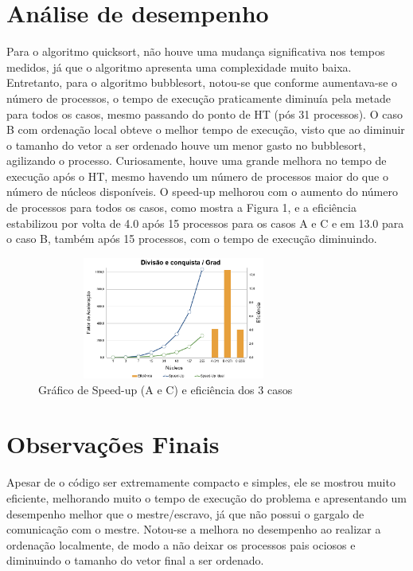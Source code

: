 \documentclass{article}
\begin{document}
\begin{multicols*}{2}
\section{Análise de desempenho}
Para o algoritmo quicksort, não houve uma mudança significativa nos tempos medidos, já que o algoritmo apresenta uma complexidade muito baixa. Entretanto, para o algoritmo bubblesort, notou-se que conforme aumentava-se o número de processos, o tempo de execução praticamente diminuía pela metade para todos os casos, mesmo passando do ponto de HT (pós 31 processos). O caso B com ordenação local obteve o melhor tempo de execução, visto que ao diminuir o tamanho do vetor a ser ordenado houve um menor gasto no bubblesort, agilizando o processo. Curiosamente, houve uma grande melhora no tempo de execução após o HT, mesmo havendo um número de processos maior do que o número de núcleos disponíveis. O speed-up melhorou com o aumento do número de processos para todos os casos, como mostra a Figura 1, e a eficiência estabilizou por volta de 4.0 após 15 processos para os casos A e C e em 13.0 para o caso B, também após 15 processos, com o tempo de execução diminuindo.
\begin{figure}[H]
            \centering
            \vspace{-1.1em}
            \includegraphics[width=9cm, height=4cm]{grafico.png}
            \vspace{-1.9em}
            \caption{Gráfico de Speed-up (A e C) e eficiência dos 3 casos}
            \vspace{-1.2em}
\end{figure}
\section{Observações Finais}
Apesar de o código ser extremamente compacto e simples, ele se mostrou muito eficiente, melhorando muito o tempo de execução do problema e apresentando um desempenho melhor que o mestre/escravo, já que não possui o gargalo de comunicação com o mestre. Notou-se a melhora no desempenho ao realizar a ordenação localmente, de modo a não deixar os processos pais ociosos e diminuindo o tamanho do vetor final a ser ordenado.

\end{multicols*}

\newpage


\end{document}
